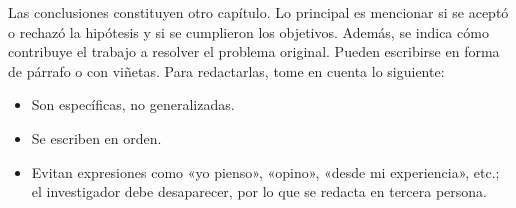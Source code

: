 Las conclusiones constituyen otro capítulo. Lo principal es mencionar si se aceptó o rechazó la hipótesis y si se cumplieron los objetivos. Además, se indica cómo contribuye el trabajo a resolver el problema original. Pueden escribirse en forma de párrafo o con viñetas. Para redactarlas, tome en cuenta lo siguiente:  

\begin{itemize}
    \item Son específicas, no generalizadas. 

    \item Se escriben en orden.

    \item Evitan expresiones como «yo pienso», «opino», «desde mi experiencia», etc.; el investigador debe desaparecer, por lo que se redacta en tercera persona.
    
\end{itemize}